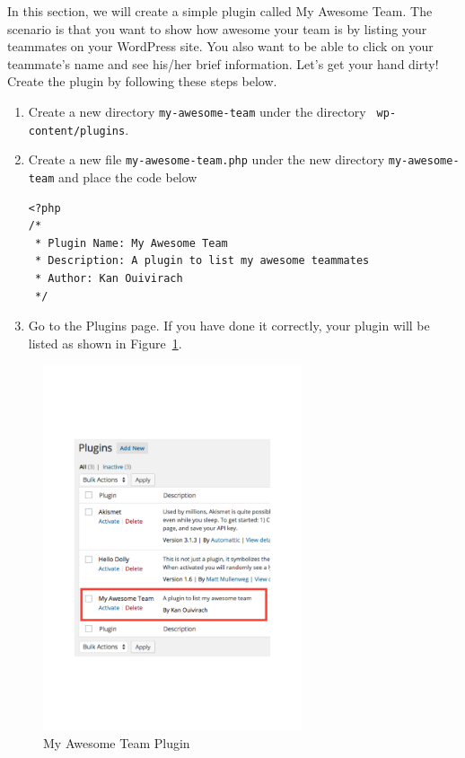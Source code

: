 \documentclass{article}
\begin{document}
\noindent In this section, we will create a simple plugin called My Awesome
Team. The scenario is that you want to show how awesome your team is by listing
your teammates on your WordPress site. You also want to be able to click on
your teammate's name and see his/her brief information. Let's get your hand
dirty! \\

\noindent Create the plugin by following these steps below.

\begin{enumerate}
    \item Create a new directory {\tt my-awesome-team} under the directory {\tt
        wp-content/plugins}.
    \item Create a new file {\tt my-awesome-team.php} under the new directory
        {\tt my-awesome-team} and place the code below
\begin{verbatim}
<?php
/*
 * Plugin Name: My Awesome Team
 * Description: A plugin to list my awesome teammates
 * Author: Kan Ouivirach
 */
\end{verbatim}
    \item Go to the Plugins page. If you have done it correctly, your plugin
        will be listed as shown in Figure~\ref{fig:my-awesome-team-plugin}.
\end{enumerate}

\begin{figure}[t]
    \centering
    \includegraphics[width=3in]{figures/my-awesome-team-plugin}
    \caption{My Awesome Team Plugin}
    \label{fig:my-awesome-team-plugin}
\end{figure}
\end{document}
